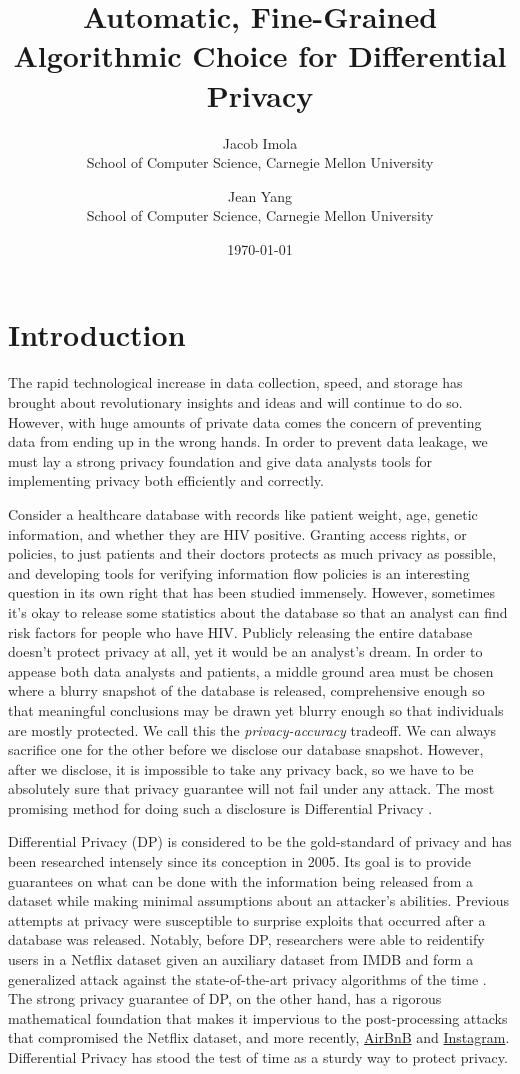 \documentclass[11pt]{article}
\title{Automatic, Fine-Grained Algorithmic Choice for Differential Privacy}
\date{\today}
\author{Jacob Imola\\ School of Computer Science, Carnegie Mellon University\and Jean Yang\\ School of Computer Science, Carnegie Mellon University}
\begin{document}
\maketitle
\section{Introduction}
The rapid technological increase in data collection, speed, and storage has brought about revolutionary insights and ideas and will continue to do so. However, with huge amounts of private data comes the concern of preventing data from ending up in the wrong hands. In order to prevent data leakage, we must lay a strong privacy foundation and give data analysts tools for implementing privacy both efficiently and correctly.

Consider a healthcare database with records like patient weight, age, genetic information, and whether they are HIV positive. Granting access rights, or policies, to just patients and their doctors protects as much privacy as possible, and developing tools for verifying information flow policies is an interesting question in its own right that has been studied immensely. However, sometimes it's okay to release some statistics about the database so that an analyst can find risk factors for people who have HIV. Publicly releasing the entire database doesn't protect privacy at all, yet it would be an analyst's dream. In order to appease both data analysts and patients, a middle ground area must be chosen where a blurry snapshot of the database is released, comprehensive enough so that meaningful conclusions may be drawn yet blurry enough so that individuals are mostly protected. We call this the \emph{privacy-accuracy} tradeoff. We can always sacrifice one for the other before we disclose our database snapshot. However, after we disclose, it is impossible to take any privacy back, so we have to be absolutely sure that privacy guarantee will not fail under any attack. The most promising method for doing such a disclosure is Differential Privacy \cite{Dwork:2006}.

Differential Privacy (DP) is considered to be the gold-standard of privacy and has been researched intensely since its conception in 2005. Its goal is to provide guarantees on what can be done with the information being released from a dataset while making minimal assumptions about an attacker's abilities. Previous attempts at privacy were susceptible to surprise exploits that occurred after a database was released. Notably, before DP, researchers were able to reidentify users in a Netflix dataset given an auxiliary dataset from IMDB and form a generalized attack against the state-of-the-art privacy algorithms of the time \cite{Narayanan:2006}. The strong privacy guarantee of DP, on the other hand, has a rigorous mathematical foundation that makes it impervious to the post-processing attacks that compromised the Netflix dataset, and more recently, \href{https://hackernoon.com/how-to-rob-an-airbnb-252e7e7eda44}{AirBnB} and \href{https://gizmodo.com/this-is-almost-certainly-james-comey-s-twitter-account-1793843641}{Instagram}. Differential Privacy has stood the test of time as a sturdy way to protect privacy.
\end{document}
